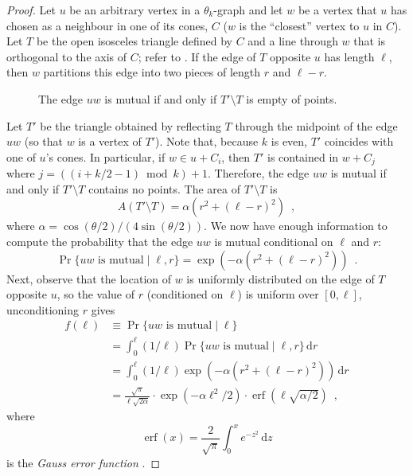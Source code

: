 \documentclass[twoside,leqno,twocolumn]{article}
\DeclareMathOperator{\erf}{erf}
\begin{document}
\begin{proof}
  Let $u$ be an arbitrary vertex in a $\theta_k$-graph and let $w$
  be a vertex that $u$ has chosen as a neighbour in one of its cones,
  $C$ ($w$ is the ``closest'' vertex to $u$ in $C$).  Let $T$ be the
  open isosceles triangle defined by $C$ and a line through $w$ that is
  orthogonal to the axis of $C$; refer to .  If the edge
  of $T$ opposite $u$ has length $\ell$, then $w$ partitions this edge
  into two pieces of length $r$ and $\ell-r$.

  \begin{figure}
    \caption{The edge $uw$ is mutual if and only if $T'\setminus T$ 
       is empty of points.}
  \end{figure}
 
  Let $T'$ be the triangle obtained by reflecting $T$ through the
  midpoint of the edge $uw$ (so that $w$ is a vertex of $T'$). Note
  that, because $k$ is even, $T'$ coincides with one of $u$'s cones.
  In particular, if $w\in u+C_i$, then $T'$ is contained in $w+C_{j}$
  where $j=((i+k/2-1)\bmod k)+1$.  Therefore, the edge $uw$ is mutual if and
  only if $T'\setminus T$ contains no points.  The area of $T'\setminus
  T$ is
  \[
     A(T'\setminus T) = \alpha(r^2+(\ell-r)^2)  \enspace ,
  \]
  where $\alpha=\cos(\theta/2)/(4\sin(\theta/2))$.  We now have
  enough information to compute the probability that the edge $uw$
  is mutual conditional on $\ell$ and $r$:
  \[
    \Pr\{\mbox{$uw$ is mutual} \mid \ell,r\} = \exp(-\alpha(r^2+(\ell-r)^2))
      \enspace .
  \]
  Next, observe that the location of $w$ is uniformly distributed on the
  edge of $T$ opposite $u$, so the value of $r$ (conditioned on $\ell$)
  is uniform over $[0,\ell]$, unconditioning $r$ gives
  \begin{align*}
    f(\ell) & \equiv \Pr\{\mbox{$uw$ is mutual} \mid \ell\} \\
     & = \int_0^\ell 
          (1/\ell)\Pr\{\mbox{$uw$ is mutual} \mid \ell,r\}\,\mathrm{d}r \\
     & = \int_0^\ell (1/\ell)\exp(-\alpha(r^2+(\ell-r)^2))\,\mathrm{d}r \\
     & = \frac{\sqrt{\pi}}{\ell\sqrt{2\alpha}}
            \cdot\exp(-\alpha\ell^2/2)
            \cdot\erf(\ell\sqrt{\alpha/2})  \enspace ,
  \end{align*}
  where 
  \[ \erf(x)=\frac{2}{\sqrt{\pi}}\int_0^x e^{-z^2}\,\mathrm{d}z \]
  is the \emph{Gauss error function}
  \cite[Section~7.2]{abramowitz.stegun:handbook}.


\end{proof}
\end{document}
